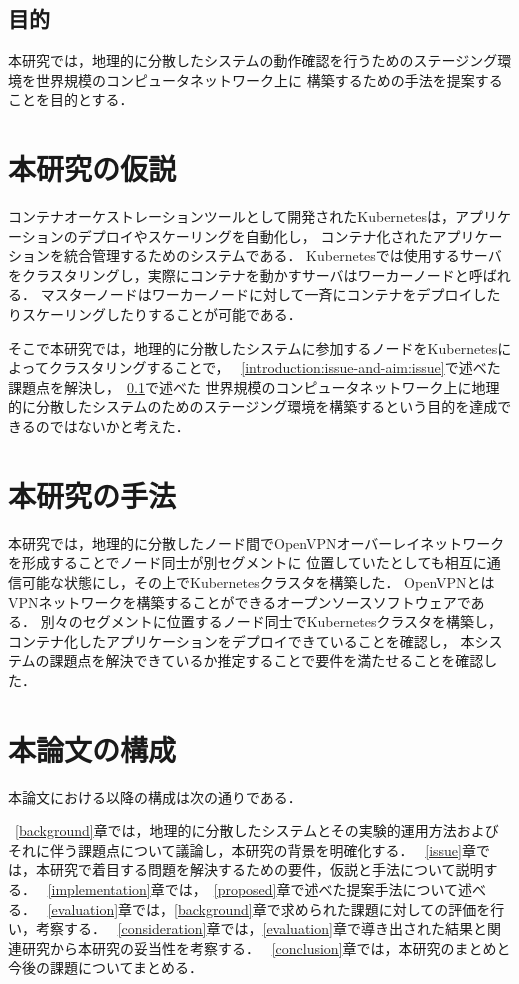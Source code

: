 \subsection{目的}
\label{introduction:issue-and-aim:aim}
本研究では，地理的に分散したシステムの動作確認を行うためのステージング環境を世界規模のコンピュータネットワーク上に
構築するための手法を提案することを目的とする．

\section{本研究の仮説}
\label{introduction:hypothesis}
コンテナオーケストレーションツールとして開発されたKubernetesは，アプリケーションのデプロイやスケーリングを自動化し，
コンテナ化されたアプリケーションを統合管理するためのシステムである．
Kubernetesでは使用するサーバをクラスタリングし，実際にコンテナを動かすサーバはワーカーノードと呼ばれる．
マスターノードはワーカーノードに対して一斉にコンテナをデプロイしたりスケーリングしたりすることが可能である．

そこで本研究では，地理的に分散したシステムに参加するノードをKubernetesによってクラスタリングすることで，
~\ref{introduction:issue-and-aim:issue}で述べた課題点を解決し，~\ref{introduction:issue-and-aim:aim}で述べた
世界規模のコンピュータネットワーク上に地理的に分散したシステムのためのステージング環境を構築するという目的を達成できるのではないかと考えた．

\section{本研究の手法}
\label{introduction:proposal}
本研究では，地理的に分散したノード間でOpenVPNオーバーレイネットワークを形成することでノード同士が別セグメントに
位置していたとしても相互に通信可能な状態にし，その上でKubernetesクラスタを構築した．
OpenVPNとはVPNネットワークを構築することができるオープンソースソフトウェアである．
別々のセグメントに位置するノード同士でKubernetesクラスタを構築し，コンテナ化したアプリケーションをデプロイできていることを確認し，
本システムの課題点を解決できているか推定することで要件を満たせることを確認した．

\section{本論文の構成}
\label{introduction:structure}
本論文における以降の構成は次の通りである．

~\ref{background}章では，地理的に分散したシステムとその実験的運用方法およびそれに伴う課題点について議論し，本研究の背景を明確化する．
~\ref{issue}章では，本研究で着目する問題を解決するための要件，仮説と手法について説明する．
~\ref{implementation}章では，~\ref{proposed}章で述べた提案手法について述べる．
~\ref{evaluation}章では，\ref{background}章で求められた課題に対しての評価を行い，考察する．
~\ref{consideration}章では，\ref{evaluation}章で導き出された結果と関連研究から本研究の妥当性を考察する．
~\ref{conclusion}章では，本研究のまとめと今後の課題についてまとめる．

